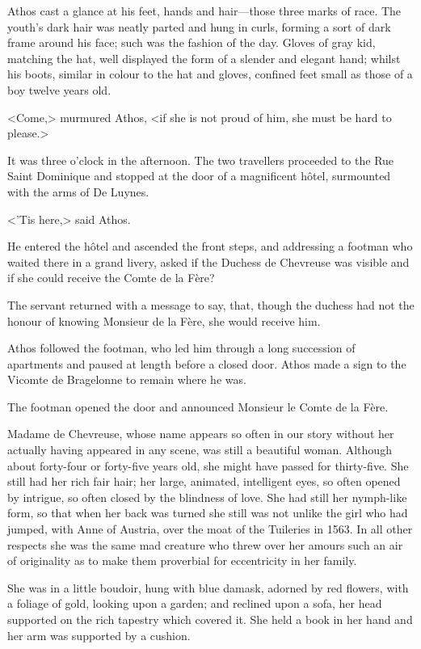 Athos cast a glance at his feet, hands and hair—those three marks of race. The youth's dark hair was neatly parted and hung in curls, forming a sort of dark frame around his face; such was the fashion of the day. Gloves of gray kid, matching the hat, well displayed the form of a slender and elegant hand; whilst his boots, similar in colour to the hat and gloves, confined feet small as those of a boy twelve years old.

<Come,> murmured Athos, <if she is not proud of him, she must be hard to please.>

It was three o'clock in the afternoon. The two travellers proceeded to the Rue Saint Dominique and stopped at the door of a magnificent hôtel, surmounted with the arms of De Luynes.

<'Tis here,> said Athos.

He entered the hôtel and ascended the front steps, and addressing a footman who waited there in a grand livery, asked if the Duchess de Chevreuse was visible and if she could receive the Comte de la Fère?

The servant returned with a message to say, that, though the duchess had not the honour of knowing Monsieur de la Fère, she would receive him.

Athos followed the footman, who led him through a long succession of apartments and paused at length before a closed door. Athos made a sign to the Vicomte de Bragelonne to remain where he was.

The footman opened the door and announced Monsieur le Comte de la Fère.

Madame de Chevreuse, whose name appears so often in our story  without her actually having appeared in any scene, was still a beautiful woman. Although about forty-four or forty-five years old, she might have passed for thirty-five. She still had her rich fair hair; her large, animated, intelligent eyes, so often opened by intrigue, so often closed by the blindness of love. She had still her nymph-like form, so that when her back was turned she still was not unlike the girl who had jumped, with Anne of Austria, over the moat of the Tuileries in 1563. In all other respects she was the same mad creature who threw over her amours such an air of originality as to make them proverbial for eccentricity in her family.

She was in a little boudoir, hung with blue damask, adorned by red flowers, with a foliage of gold, looking upon a garden; and reclined upon a sofa, her head supported on the rich tapestry which covered it. She held a book in her hand and her arm was supported by a cushion.

